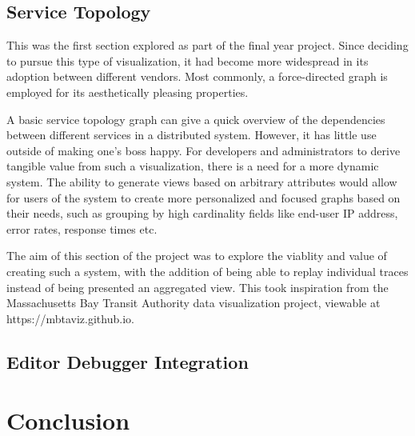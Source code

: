 \documentclass[pdftex,titlepage]{article}
\begin{document}
        \subsection{Service Topology}
        This was the first section explored as part of the final year project. Since deciding to pursue this type of visualization,
        it had become more widespread in its adoption between different vendors. Most commonly, a force-directed graph is employed
        for its aesthetically pleasing properties.

        A basic service topology graph can give a quick overview of the dependencies between different services in a distributed
        system. However, it has little use outside of making one's boss happy. For developers and administrators to derive tangible
        value from such a visualization, there is a need for a more dynamic system. The ability to generate views based on arbitrary
        attributes would allow for users of the system to create more personalized and focused graphs based on their needs,
        such as grouping by high cardinality fields like end-user IP address, error rates, response times etc.

        The aim of this section of the project was to explore the viablity and value of creating such a system, with the addition
        of being able to replay individual traces instead of being presented an aggregated view. This took inspiration from the
        Massachusetts Bay Transit Authority data visualization project, viewable at https://mbtaviz.github.io.

        \subsection{Editor Debugger Integration}


    \section{Conclusion}
\end{document}
